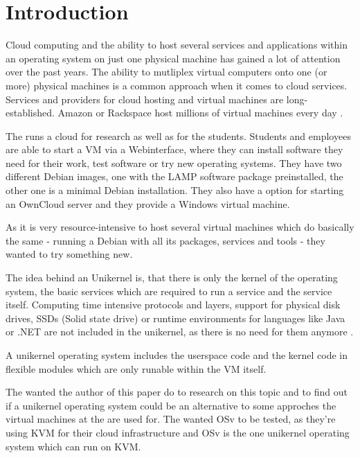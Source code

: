 \chapter{Introduction}

    Cloud computing and the ability to host several services and
    applications within an operating system on just one physical machine has
    gained a lot of attention over the past years. The ability to mutliplex
    virtual computers onto one (or more) physical machines is a common approach
    when it comes to cloud services. Services and providers for cloud hosting
    and virtual machines are long-established. Amazon or Rackspace host millions
    of virtual machines every day \cite[S. 1]{unikernels}.

    The \HFU{} runs a cloud for research as well as for the students. Students
    and employees are able to start a VM via a Webinterface, where they can
    install software they need for their work, test software or try new
    operating systems. They have two different Debian images, one with the LAMP
    software package preinstalled, the other one is a minimal Debian
    installation. They also
    have a option for starting an OwnCloud server and they provide a Windows
    virtual machine.

    As it is very resource-intensive to host several virtual machines which do
    basically the same - running a Debian with all its packages, services and
    tools - they wanted to try something new.

    The idea behind an Unikernel is, that there is only the kernel of the
    operating system, the basic services which are required to run a service and
    the service itself. Computing time intensive protocols and layers, support
    for physical disk drives, SSDs (Solid state drive) or runtime environments
    for languages like Java or .NET are not included in the unikernel, as there
    is no need for them anymore \cite[S. 1]{unikernels}.

    A unikernel operating system includes the userspace code and the kernel code
    in flexible modules which are only runable within the VM itself.

    The \HFU wanted the author of this paper do to research on this topic and to
    find out if a unikernel operating system could be an alternative to some
    approches the virtual machines at the \HFU are used for. The \HFU wanted OSv
    to be tested, as they're using KVM for their cloud infrastructure and OSv is
    the one unikernel operating system which can run on KVM.
